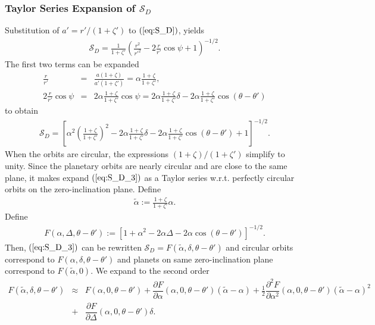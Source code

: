 \documentclass [12pt, a4paper] {article}
\newcommand{\pdiff}[2]
{
	\dfrac{\partial #1}{\partial #2}
}
\begin{document}
\subsubsection{Taylor Series Expansion of $\mathcal{S}_D$}
Substitution of $a' = r' / (1 + \zeta')$ to $(\ref{eq:S_D})$, yields
\begin {eqnarray}
    \label{eq:S_D_2}
    \mathcal{S}_D 
    =
    \frac{1}{1 + \zeta'}
    \left(
        \frac{r^2}{r'^2}
        -
        2\frac{r}{r'}\cos\psi 
        + 
        1
    \right)^{-1/2}.
\end {eqnarray}
The first two terms can be expanded 
\begin {eqnarray}
    \frac{r}{r'}
    &=&
    \frac{a(1 + \zeta)}{a'(1 + \zeta')}
    =
    \alpha 
    \frac{1 + \zeta}{1 + \zeta'},
    \\
    2\frac{r}{r'}\cos\psi 
    &=&
    2\alpha\frac{1 + \zeta}{1 + \zeta'}\cos\psi
    =
    2\alpha\frac{1 + \zeta}{1 + \zeta'}\delta 
    -
    2\alpha\frac{1 + \zeta}{1 + \zeta'}\cos(\theta - \theta')
\end {eqnarray}
to obtain 
\begin {eqnarray}
    \label{eq:S_D_3}
    \mathcal{S}_D
    =
    \left[
    \alpha^2\left(\frac{1 + \zeta}{1 + \zeta'}\right)^2
    -
    2\alpha\frac{1 + \zeta}{1 + \zeta'}\delta 
    - 
    2\alpha \frac{1 + \zeta}{1 + \zeta'}\cos(\theta - \theta')
    +
    1
    \right]^{-1/2}.
\end {eqnarray}
When the orbits are circular, the expressions $(1 + \zeta) / (1 + \zeta')$ simplify to unity. 
Since the planetary orbits are nearly circular and are close to the same plane, it makes expand 
$(\ref{eq:S_D_3})$ as a Taylor series w.r.t. perfectly circular orbits on the zero-inclination 
plane. Define 
\begin {eqnarray}
    \tilde\alpha := \frac{1 + \zeta}{1 + \zeta'}\alpha.
\end {eqnarray}
Define
\begin {eqnarray}
    F(\alpha, \Delta, \theta - \theta')
    :=
    \left[
    1 
    +
    \alpha^2
    -
    2\alpha\Delta 
    - 
    2\alpha\cos(\theta - \theta')
    \right]^{-1/2}.
\end {eqnarray}
Then, $(\ref{eq:S_D_3})$ can be rewritten $\mathcal{S}_D = F(\tilde\alpha, \delta, \theta - \theta')$ 
and circular orbits correspond to $F(\alpha, \delta, \theta - \theta')$ 
and planets on same zero-inclination plane correspond to $F(\tilde\alpha, 0)$. We expand to the 
second order
\begin {eqnarray}
    \label{eq:F_taylor}
    F(\tilde\alpha, \delta, \theta - \theta') 
    &\approx& 
    F(\alpha, 0, \theta - \theta')
    +
    \pdiff{F}{\alpha}(\alpha, 0,  \theta - \theta')(\tilde\alpha - \alpha) 
    +
    \frac{1}{2}\pdiff{^2F}{\alpha^2}(\alpha, 0,  \theta - \theta')(\tilde\alpha - \alpha)^2 
    \\\nonumber
    &+&
    \pdiff{F}{\Delta}(\alpha, 0,  \theta - \theta')\delta.
\end {eqnarray}
\end{document}
